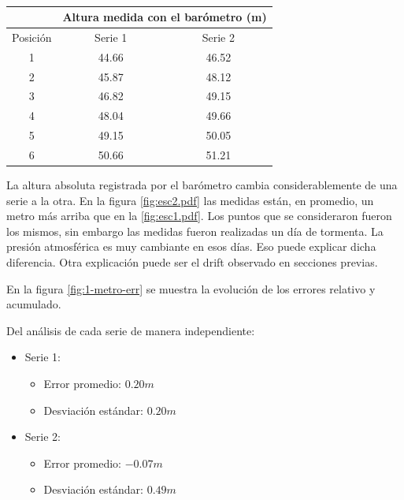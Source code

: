 \documentclass[main]{subfiles}
\begin{document}
\begin{table}
\vspace{-15pt}
\begin{tabular}{c|c|c|} 
	& \multicolumn{2}{|p{100pt}|}{\cellcolor[gray]{0.8} Altura medida con el bar\'ometro (m)}      \\ \hline
\cellcolor[gray]{0.8} {Posici\'on} & \cellcolor[gray]{0.8} {Serie 1} &\cellcolor[gray]{0.8} {Serie 2}\\ \hline

\multicolumn{1}{|c|}{1} & 44.66 & 46.52 \\ \hline
\multicolumn{1}{|c|}{2} & 45.87 & 48.12\\ \hline
\multicolumn{1}{|c|}{3} & 46.82 & 49.15\\ \hline
\multicolumn{1}{|c|}{4} & 48.04 & 49.66\\ \hline
\multicolumn{1}{|c|}{5} & 49.15 & 50.05\\ \hline
\multicolumn{1}{|c|}{6} & 50.66 & 51.21 \\ \hline

\end{tabular}
\caption{}
\label{tab:alturasm}
\end{table}

La altura absoluta registrada por el bar\'ometro cambia considerablemente de una serie a la otra. En la figura \ref{fig:esc2.pdf} las medidas est\'an, en promedio, un metro m\'as arriba que en la \ref{fig:esc1.pdf}. Los puntos que se consideraron fueron los mismos, sin embargo las medidas fueron realizadas un d\'ia de tormenta. La presi\'on atmosf\'erica es muy cambiante en esos d\'ias. Eso puede explicar dicha diferencia. Otra explicaci\'on puede ser el drift observado en secciones previas.

En la figura \ref{fig:1-metro-err} se muestra la evoluci\'on de los errores relativo y acumulado.



Del an\'alisis de cada serie de manera independiente:
\begin{itemize}
\item Serie 1:
		\begin{itemize}
		\item Error promedio: $0.20m$
		\item Desviaci\'on est\'andar: $0.20m$
		\end{itemize}
\item Serie 2:
		\begin{itemize}
		\item Error promedio: $-0.07m$
		\item Desviaci\'on est\'andar: $0.49m$
		\end{itemize}
\end{itemize}
\end{document}
